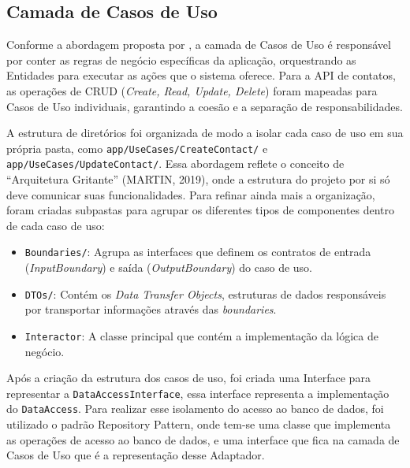\subsection{Camada de Casos de Uso}
\label{sec:casos_de_uso}

    \par Conforme a abordagem proposta por \cite{livro:martin:cleanarch}, a camada de Casos de Uso é responsável por conter as regras de negócio específicas da aplicação, orquestrando as Entidades para executar as ações que o sistema oferece. Para a API de contatos, as operações de CRUD (\textit{Create, Read, Update, Delete}) foram mapeadas para Casos de Uso individuais, garantindo a coesão e a separação de responsabilidades.

    \par A estrutura de diretórios foi organizada de modo a isolar cada caso de uso em sua própria pasta, como \texttt{app/UseCases/CreateContact/} e \texttt{app/UseCases/UpdateContact/}. Essa abordagem reflete o conceito de ``Arquitetura Gritante'' (MARTIN, 2019), onde a estrutura do projeto por si só deve comunicar suas funcionalidades. Para refinar ainda mais a organização, foram criadas subpastas para agrupar os diferentes tipos de componentes dentro de cada caso de uso:
        
    \begin{itemize}
        \item \texttt{Boundaries/}: Agrupa as interfaces que definem os contratos de entrada (\textit{InputBoundary}) e saída (\textit{OutputBoundary}) do caso de uso.
        
        \item \texttt{DTOs/}: Contém os \textit{Data Transfer Objects}, estruturas de dados responsáveis por transportar informações através das \textit{boundaries}.
        
        \item \texttt{Interactor}: A classe principal que contém a implementação da lógica de negócio.
    \end{itemize}

    \par Após a criação da estrutura dos casos de uso, foi criada uma Interface para representar a \texttt{DataAccessInterface}, essa interface representa a implementação do \texttt{DataAccess}. Para realizar esse isolamento do acesso ao banco de dados, foi utilizado o padrão Repository Pattern, onde tem-se uma classe que implementa as operações de acesso ao banco de dados, e uma interface que fica na camada de Casos de Uso que é a representação desse Adaptador.

